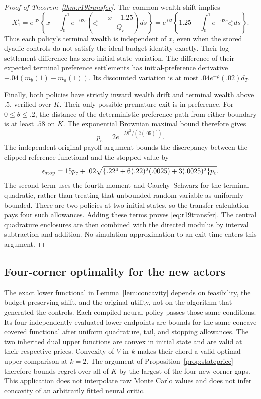 \begin{proof}[Proof of Theorem~\ref{thm:r19transfer}]
The common wealth shift implies
\[
 X_1^i=e^{.02}\left\{x-\int_0^1e^{-.02s}
       \left(c_s^i+\frac{x-1.25}{Q_r}\right)ds\right\}
 =e^{.02}\left\{1.25-\int_0^1e^{-.02s}c_s^i ds\right\}.
\]
Thus each policy's terminal wealth is independent of $x$, even when the stored dyadic controls do not satisfy the ideal budget identity exactly. Their log-settlement difference has zero initial-state variation. The difference of their expected terminal preference settlements has initial-preference derivative $-.04(m_b(1)-m_a(1))$. Its discounted variation is at most $.04e^{-\rho}(.02)d_T$.

Finally, both policies have strictly inward wealth drift and terminal wealth above $.5$, verified over $K$. Their only possible premature exit is in preference. For $0\leq\theta\leq .2$, the distance of the deterministic preference path from either boundary is at least $.58$ on $K$. The exponential Brownian maximal bound therefore gives
\[
 p_e=2e^{-.58^2/(2(.05)^2)}.
\]
The independent original-payoff argument bounds the discrepancy between the clipped reference functional and the stopped value by
\[
 \epsilon_{\rm stop}=15p_e+.02\sqrt{
  \{.22^4+6(.22)^2(.0025)+3(.0025)^2\}p_e}.
\]
The second term uses the fourth moment and Cauchy--Schwarz for the terminal quadratic, rather than treating that unbounded random variable as uniformly bounded. There are two policies at two initial states, so the transfer calculation pays four such allowances. Adding these terms proves \eqref{eq:r19transfer}. The central quadrature enclosures are then combined with the directed modulus by interval subtraction and addition. No simulation approximation to an exit time enters this argument.
\end{proof}

\subsection{Four-corner optimality for the new actors}
The exact lower functional in Lemma~\ref{lem:concavity} depends on feasibility, the budget-preserving shift, and the original utility, not on the algorithm that generated the controls. Each compiled neural policy passes those same conditions. Its four independently evaluated lower endpoints are bounds for the same concave covered functional after uniform quadrature, tail, and stopping allowances. The two inherited dual upper functions are convex in initial state and are valid at their respective prices. Convexity of $V$ in $k$ makes their chord a valid optimal upper comparison at $k=2$. The argument of Proposition~\ref{prop:stateprice} therefore bounds regret over all of $K$ by the largest of the four new corner gaps. This application does not interpolate raw Monte Carlo values and does not infer concavity of an arbitrarily fitted neural critic.

